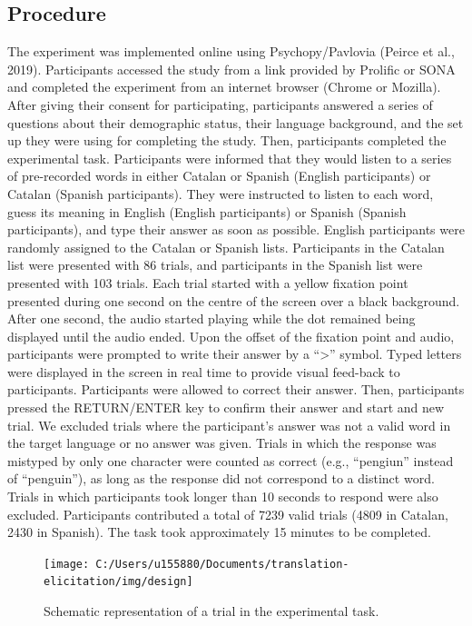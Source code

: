 \documentclass[
  english,
  man,floatsintext]{apa7}
\begin{document}
\hypertarget{procedure}{%
\subsection{Procedure}\label{procedure}}

The experiment was implemented online using Psychopy/Pavlovia (Peirce et al., 2019). Participants accessed the study from a link provided by Prolific or SONA and completed the experiment from an internet browser (Chrome or Mozilla). After giving their consent for participating, participants answered a series of questions about their demographic status, their language background, and the set up they were using for completing the study. Then, participants completed the experimental task. Participants were informed that they would listen to a series of pre-recorded words in either Catalan or Spanish (English participants) or Catalan (Spanish participants). They were instructed to listen to each word, guess its meaning in English (English participants) or Spanish (Spanish participants), and type their answer as soon as possible. English participants were randomly assigned to the Catalan or Spanish lists. Participants in the Catalan list were presented with 86 trials, and participants in the Spanish list were presented with 103 trials. Each trial started with a yellow fixation point presented during one second on the centre of the screen over a black background. After one second, the audio started playing while the dot remained being displayed until the audio ended. Upon the offset of the fixation point and audio, participants were prompted to write their answer by a ``\textgreater{}'' symbol. Typed letters were displayed in the screen in real time to provide visual feed-back to participants. Participants were allowed to correct their answer. Then, participants pressed the RETURN/ENTER key to confirm their answer and start and new trial. We excluded trials where the participant's answer was not a valid word in the target language or no answer was given. Trials in which the response was mistyped by only one character were counted as correct (e.g., ``pengiun'' instead of ``penguin''), as long as the response did not correspond to a distinct word. Trials in which participants took longer than 10 seconds to respond were also excluded. Participants contributed a total of 7239 valid trials (4809 in Catalan, 2430 in Spanish). The task took approximately 15 minutes to be completed.

\begin{figure}
\texttt{[image: C:/Users/u155880/Documents/translation-elicitation/img/design]} \caption{Schematic representation of a trial in the experimental task.}\label{fig:procedurefigure}
\end{figure}
\end{document}
